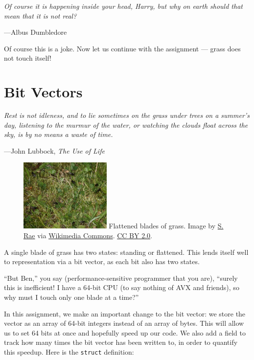 \documentclass[11pt]{article}
\begin{document}
\setlength{\epigraphwidth}{0.46\textwidth}
\epigraph{\emph{Of course it is happening inside your head, Harry, but why on earth should that mean that it is not real?}}{---Albus Dumbledore}
\setlength{\epigraphwidth}{0.76\textwidth}

\noindent
Of course this is a joke. Now let us continue with the assignment --- grass does not touch itself!

\section{Bit Vectors}

\epigraph{\emph{Rest is not idleness, and to lie sometimes on the grass under trees on a summer's day, listening to the murmur of the water, or watching the clouds float across the sky, is by no means a waste of time.}}{---John Lubbock, \emph{The Use of Life}}

\begin{figure}
\includegraphics[width=0.4\textwidth]{flat}
Flattened blades of grass. Image by \href{https://www.flickr.com/people/35142635@N05}{S. Rae} via \href{https://commons.wikimedia.org/wiki/File:Hydrotaea_sp\%5E_on_flattened_grass_patch_-_Flickr_-_S._Rae.jpg}{Wikimedia Commons}. \href{https://creativecommons.org/licenses/by/2.0}{CC BY 2.0}.
\end{figure}

\noindent
A single blade of grass has two states: standing or flattened. This lends itself well to representation via a bit vector, as each bit also has two states.

``But Ben,'' you say (performance-sensitive programmer that you are), ``surely this is inefficient! I have a 64-bit CPU (to say nothing of AVX and friends), so why must I touch only one blade at a time?''

In this assignment, we make an important change to the bit vector: we store the vector as an array of 64-bit integers instead of an array of bytes. This will allow us to set 64 bits at once and hopefully speed up our code. We also add a field to track how many times the bit vector has been written to, in order to quantify this speedup. Here is the \texttt{struct} definition:
\end{document}
